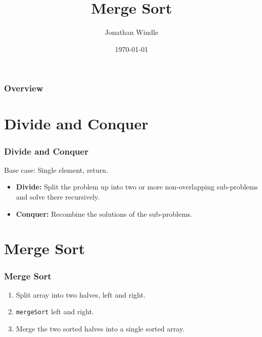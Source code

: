 \documentclass{beamer}
\title[Merge Sort]{Merge Sort} %
\author{Jonathan Windle} %
\institute[UEA] %
{
University of East Anglia \\ %
\medskip
\textit{J.Windle@uea.ac.uk} %
}
\date{\today} %
\begin{document}
\begin{frame}
\titlepage %
\end{frame}

\begin{frame}[allowframebreaks]
\frametitle{Overview} %
\tableofcontents %
\end{frame} 


\section{Divide and Conquer}
\begin{frame}
\frametitle{Divide and Conquer}
Base case: Single element, return.
\begin{itemize}
\item \textbf{Divide:} Split the problem up into two or more {\color{red}non-overlapping} sub-problems and solve there recursively.
\item \textbf{Conquer:} Recombine the solutions of the sub-problems.
\end{itemize}
\end{frame}
\section{Merge Sort}
\begin{frame}
\frametitle{Merge Sort}
\begin{enumerate}
\item Split array into two halves, left and right.
\item \texttt{mergeSort} left and right.
\item Merge the two sorted halves into a single sorted array.
\merg
\end{enumerate}
\end{frame}
\end{document}
